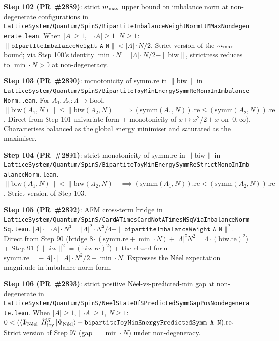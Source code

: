 \documentclass[a4paper,11pt]{article}
\begin{document}
\textbf{Step 102 (PR~\#2889)}: strict $m_{\rm max}$ upper bound on
imbalance norm at non-degenerate configurations in
\texttt{LatticeSystem/Quantum/SpinS/BipartiteImbalanceWeightNormLtMMaxNondegenerate.lean}.
When $|A| \ge 1$, $|\neg A| \ge 1$, $N \ge 1$:
$\|\texttt{bipartiteImbalanceWeight A N}\| < |\Lambda|\cdot N/2$.
Strict version of the $m_{\rm max}$ bound; via Step 100's identity
$\min\cdot N = |\Lambda|\cdot N/2 - \|\mathrm{biw}\|$, strictness
reduces to $\min\cdot N > 0$ at non-degeneracy.

\textbf{Step 103 (PR~\#2890)}: monotonicity of $\mathrm{symm.re}$ in
$\|\mathrm{biw}\|$ in
\texttt{LatticeSystem/Quantum/SpinS/BipartiteToyMinEnergySymmReMonoInImbalanceNorm.lean}.
For $A_1, A_2 : \Lambda \to \mathrm{Bool}$,
$\|\mathrm{biw}(A_1, N)\| \le \|\mathrm{biw}(A_2, N)\|
   \implies (\mathrm{symm}(A_1, N)).\mathrm{re} \le
            (\mathrm{symm}(A_2, N)).\mathrm{re}$.
Direct from Step 101 univariate form + monotonicity of
$x \mapsto x^2/2 + x$ on $[0, \infty)$. Characterises balanced as
the global energy minimiser and saturated as the maximiser.

\textbf{Step 104 (PR~\#2891)}: strict monotonicity of
$\mathrm{symm.re}$ in $\|\mathrm{biw}\|$ in
\texttt{LatticeSystem/Quantum/SpinS/BipartiteToyMinEnergySymmReStrictMonoInImbalanceNorm.lean}.
$\|\mathrm{biw}(A_1, N)\| < \|\mathrm{biw}(A_2, N)\|
   \implies (\mathrm{symm}(A_1, N)).\mathrm{re} <
            (\mathrm{symm}(A_2, N)).\mathrm{re}$.
Strict version of Step 103.

\textbf{Step 105 (PR~\#2892)}: AFM cross-term bridge in
\texttt{LatticeSystem/Quantum/SpinS/CardATimesCardNotATimesNSqViaImbalanceNormSq.lean}.
$|A|\cdot|\neg A|\cdot N^2 = |\Lambda|^2\cdot N^2/4
   - \|\texttt{bipartiteImbalanceWeight A N}\|^2$.
Direct from Step 90 (bridge $8\cdot(\mathrm{symm.re}+\min\cdot N)
+ |\Lambda|^2 N^2 = 4\cdot(\mathrm{biw.re})^2$) + Step 91
($\|\mathrm{biw}\|^2 = (\mathrm{biw.re})^2$) + the closed form
$\mathrm{symm.re} = -|A|\cdot|\neg A|\cdot N^2/2 - \min\cdot N$.
Expresses the Néel expectation magnitude in imbalance-norm form.

\textbf{Step 106 (PR~\#2893)}: strict positive Néel-vs-predicted-min
gap at non-degenerate in
\texttt{LatticeSystem/Quantum/SpinS/NeelStateOfSPredictedSymmGapPosNondegenerate.lean}.
When $|A| \ge 1$, $|\neg A| \ge 1$, $N \ge 1$:
$0 < (\langle\Phi_{\rm N\acute{e}el} |\,\widehat H_{\rm toy}^S\,
   | \Phi_{\rm N\acute{e}el}\rangle
   - \texttt{bipartiteToyMinEnergyPredictedSymm A N}).\mathrm{re}$.
Strict version of Step 97 (gap $= \min\cdot N$) under non-degeneracy.
\end{document}
